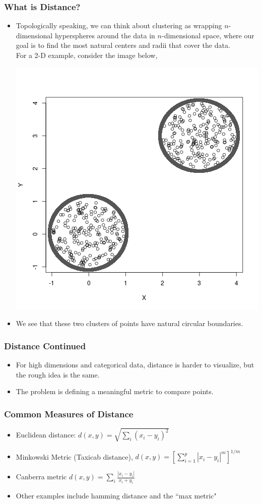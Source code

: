 \documentclass{beamer}
\begin{document}
\begin{frame}
\frametitle{What is Distance?}
\begin{itemize}
\item Topologically speaking, we can think about clustering as wrapping $n$-dimensional hyperspheres around the data in $n$-dimensional space, where our goal is to find the most natural centers and radii that cover the data.\\
\pause
For a 2-D example, consider the image below,
\begin{center}
\includegraphics[scale=.20]{circles.png}
\end{center}
\item We see that these two clusters of points have natural circular boundaries.
\end{itemize}
\end{frame}
\begin{frame}
\frametitle{Distance Continued}
\begin{itemize}
\item For high dimensions and categorical data, distance is harder to visualize, but the rough idea is the same.
\pause
\item The problem is defining a meaningful metric to compare points.
\end{itemize}
\end{frame}

\begin{frame}
\frametitle{Common Measures of Distance}
\begin{itemize}
\item Euclidean distance: $d(x,y)=\sqrt{\sum_i (x_i-y_i)^2}$
\item Minkowski Metric (Taxicab distance), $d(x,y)=\left[\sum_{i=1}^p|x_i-y_i|^m\right]^{1/m}$
\item Canberra metric $d(x,y)=\sum_i \frac{|x_i-y_i|}{x_i+y_i}$
\pause
\item Other examples include hamming distance and the ``max metric"
\end{itemize}
\end{frame}
\end{document}
